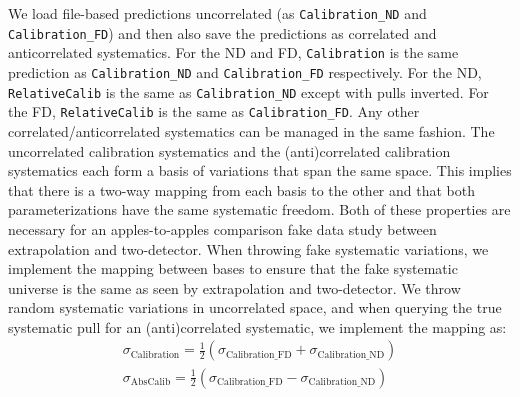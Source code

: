 \documentclass{article}
\begin{document}
We load file-based predictions uncorrelated (as \texttt{Calibration\_\-ND} and \texttt{Calibration\_\-FD}) and then also save the predictions as correlated and anticorrelated systematics. For the ND and FD, \texttt{Calibration} is the same prediction as \texttt{Calibration\_\-ND} and \texttt{Calibration\_\-FD} respectively. For the ND, \texttt{Relative\-Calib} is the same as \texttt{Calibration\_\-ND} except with pulls inverted. For the FD, \texttt{Relative\-Calib} is the same as \texttt{Calibration\_\-FD}. Any other correlated/anticorrelated systematics can be managed in the same fashion. The uncorrelated calibration systematics and the (anti)correlated calibration systematics each form a basis of variations that span the same space. This implies that there is a two-way mapping from each basis to the other and that both parameterizations have the same systematic freedom. Both of these properties are necessary for an apples-to-apples comparison fake data study between extrapolation and two-detector. When throwing fake systematic variations, we implement the mapping between bases to ensure that the fake systematic universe is the same as seen by extrapolation and two-detector. We throw random systematic variations in uncorrelated space, and when querying the true systematic pull for an (anti)correlated systematic, we implement the mapping as:
\begin{equation}
\begin{split}
\sigma_{\mathrm{Calibration}} = \frac{1}{2} ( \sigma_{\mathrm{Calibration\_FD}} + \sigma_{\mathrm{Calibration\_ND}} ) \\
\sigma_{\mathrm{AbsCalib}} = \frac{1}{2} ( \sigma_{\mathrm{Calibration\_FD}} - \sigma_{\mathrm{Calibration\_ND}} )
\end{split}
\end{equation}
\end{document}
